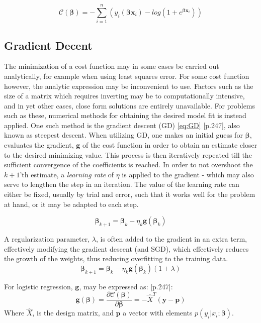 \documentclass[%
oneside,                 %
final,                   %
10pt]{article}
\begin{document}
\begin{equation}
\mathcal{C}(\bm{\beta})=-\sum_{i=1}^n \left(y_i({\bm{\beta}}\bm{x}_i)-log(1+e^{{\bm{\beta}}\bm{x}_i})\right)
\label{eq:cost_log}
\end{equation}

\subsection{Gradient Decent}  \label{Section_M_GD}
The minimization of a cost function may in some cases be carried out analytically, for example when using least squares error. For some cost function however, the analytic expression may be inconvenient to use. Factors such as the size of a matrix which requires inverting may be to computationally intensive, and in yet other cases, close form solutions are entirely unavailable. For problems such as these, numerical methods for obtaining the desired model fit is instead applied. One such method is the gradient descent (GD) \eqref{eq:GD} \citep{MLMurphy}[p.247], also known as steepest descent. When utilizing GD, one makes an initial guess for $\bm{\beta}$, evaluates the gradient, $\bm g$ of the cost function in order to obtain an estimate closer to the desired minimizing value. This process is then iteratively repeated till the sufficient convergence of the coefficients is reached. In order to not overshoot the $k+1$'th estimate, a \textit{learning rate} of $\eta$ is applied to the gradient - which may also serve to lengthen the step in an iteration. The value of the learning rate can either be fixed, usually by trial and error, such that it works well for the problem at hand, or it may be adapted to each step. 

\begin{equation}
\bm{\beta}_{k+1}=\bm{\beta}_{k}-\eta_k  \bm g (\bm{\beta}_k)
\label{eq:GD}
\end{equation}

A regularization parameter, $\lambda $, is often added to the gradient in an extra term, effectively modifying the gradient descent (and SGD), which effectively reduces the growth of the weights, thus reducing overfitting to the training data.
\begin{equation}
\bm{\beta}_{k+1}=\bm{\beta}_{k}-\eta_k  \bm g (\bm{\beta}_k)(1+\lambda)
\end{equation}

For logistic regression, $\bm g$, may be expressed as: \citep{MLMurphy}[p.247]:
\begin{equation}
\bm g (\bm \beta)= \frac{\partial \mathcal{C}(\bm{\beta})}{\partial \bm \beta}= -\hat{X}^T(\bm y-\bm p )
\end{equation}
Where $\hat{X}$, is the design matrix, and $\bm p$ a vector with elements $p(y_i|x_i;\bm \beta)$. \newline
\end{document}
